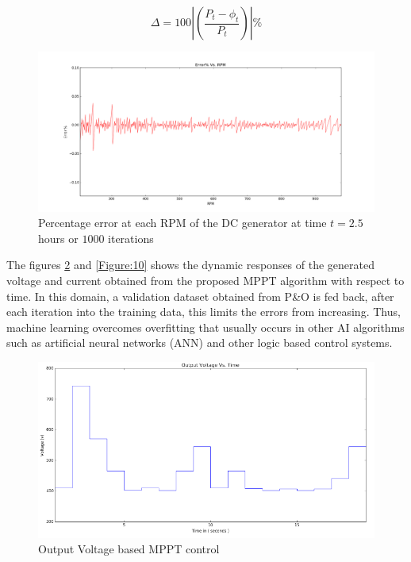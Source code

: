 \begin{equation} \label{eq:9}
\Delta  = 100| ( \frac{P_t - \phi_t}{P_t})|\%
\end{equation}
\begin{center}
\begin{figure}
\includegraphics[width=12cm,keepaspectratio]{7.png}
\caption{ Percentage error at each RPM of the DC generator at time $t = 2.5$ hours or $1000$ iterations}
\label{Figure:8}    
\end{figure}
\end{center}
The figures \ref{Figure:9} and \ref{Figure:10} shows the dynamic responses of the generated voltage and current obtained from the proposed MPPT algorithm with respect to time. In this domain,  a validation dataset obtained from P\&O is fed back, after each iteration into the training data, this limits the errors from increasing. Thus, machine learning overcomes overfitting that usually occurs in other AI algorithms such as artificial neural networks (ANN) and other logic based control systems.
\begin{figure}
\includegraphics[width=12cm,keepaspectratio]{8.png}
\caption {Output Voltage based MPPT control}
\label{Figure:9}    
\end{figure}

